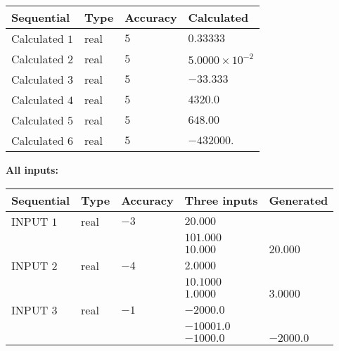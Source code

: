 \documentclass[12pt]{article}
\begin{document}
  
\noindent\begin{tabular}{|l|l|l|l|}
\hline
 Sequential & Type & Accuracy & Calculated \\ 
\hline
 
 
  Calculated $            1 $ & real & $            5  $ & 
 $ 0.33333 $ 
 \\  \hline  
 
 
  Calculated $            2 $ & real & $            5  $ & 
 $ 5.0000 \times 10^{-2} $ 
 \\  \hline  
 
 
  Calculated $            3 $ & real & $            5  $ & 
 $ -33.333 $ 
 \\  \hline  
 
 
  Calculated $            4 $ & real & $            5  $ & 
 $ 4320.0 $ 
 \\  \hline  
 
 
  Calculated $            5 $ & real & $            5  $ & 
 $ 648.00 $ 
 \\  \hline  
 
 
  Calculated $            6 $ & real & $            5  $ & 
 $ -432000. $ 
 \\  \hline  
 \end{tabular}
   
   
   
   
\noindent\vspace{0.1in}\hspace{-0.08in} {\textbf{\Large{All inputs: }}}
   
   
  
  
\noindent\begin{tabular}{|l|l|l|l|l|}
\hline
 Sequential & Type & Accuracy & Three inputs & Generated \\ 
\hline
 
 
  INPUT $            1 $ & real & $           -3  $ & $
 20.000
  $ & \\
  & & &  $
 101.000
  $ & \\
  & & &  $
 10.000
 $ & $ 20.000 $ 
 \\  \hline  
 
 
  INPUT $            2 $ & real & $           -4  $ & $
 2.0000
  $ & \\
  & & &  $
 10.1000
  $ & \\
  & & &  $
 1.0000
 $ & $ 3.0000 $ 
 \\  \hline  
 
 
  INPUT $            3 $ & real & $           -1  $ & $
 -2000.0
  $ & \\
  & & &  $
 -10001.0
  $ & \\
  & & &  $
 -1000.0
 $ & $ -2000.0 $ 
 \\  \hline  
 \end{tabular}
   
\end{document}
